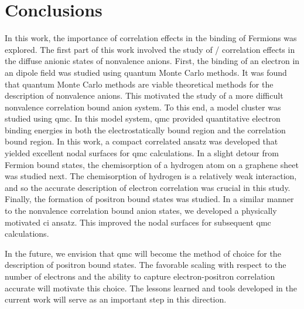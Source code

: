 \chapter{Conclusions}

In this work, the importance of correlation effects in the binding of Fermions was explored.
The first part of this work involved the study of / correlation effects in the diffuse anionic states of nonvalence anions.
First, the binding of an electron in an dipole field was studied using quantum Monte Carlo methods.
It was found that quantum Monte Carlo methods are viable theoretical methods for the description of nonvalence anions.
This motivated the study of a more difficult nonvalence correlation bound anion system.
To this end, a model  cluster was studied using \gls{qmc}.
In this model system, \gls{qmc} provided quantitative electron binding energies in both the electrostatically bound region and the correlation bound region.
In this work, a compact correlated ansatz was developed that yielded excellent nodal surfaces for \gls{qmc} calculations.
In a slight detour from Fermion bound states, the chemisorption of a hydrogen atom on a graphene sheet was studied next.
The chemisorption of hydrogen is a relatively weak interaction, and so the accurate description of electron correlation was crucial in this study. 
Finally, the formation of positron bound states was studied.
In a similar manner to the nonvalence correlation bound anion states, we developed a physically motivated \gls{ci} ansatz.
This improved the nodal surfaces for subsequent \gls{qmc} calculations.

In the future, we envision that \gls{qmc} will become the method of choice for the description of positron bound states.
The favorable scaling with respect to the number of electrons and the ability to capture electron-positron correlation accurate will motivate this choice.
The lessons learned and tools developed in the current work will serve as an important step in this direction.
